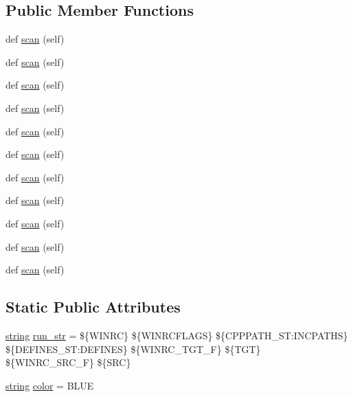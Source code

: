 \subsection*{Public Member Functions}
\begin{DoxyCompactItemize}
\item 
def \hyperlink{classwaflib_1_1_tools_1_1winres_1_1winrc_a7a306976a792ece0336a2e4a2cccf0e8}{scan} (self)
\item 
def \hyperlink{classwaflib_1_1_tools_1_1winres_1_1winrc_a7a306976a792ece0336a2e4a2cccf0e8}{scan} (self)
\item 
def \hyperlink{classwaflib_1_1_tools_1_1winres_1_1winrc_a7a306976a792ece0336a2e4a2cccf0e8}{scan} (self)
\item 
def \hyperlink{classwaflib_1_1_tools_1_1winres_1_1winrc_a7a306976a792ece0336a2e4a2cccf0e8}{scan} (self)
\item 
def \hyperlink{classwaflib_1_1_tools_1_1winres_1_1winrc_a7a306976a792ece0336a2e4a2cccf0e8}{scan} (self)
\item 
def \hyperlink{classwaflib_1_1_tools_1_1winres_1_1winrc_a7a306976a792ece0336a2e4a2cccf0e8}{scan} (self)
\item 
def \hyperlink{classwaflib_1_1_tools_1_1winres_1_1winrc_a7a306976a792ece0336a2e4a2cccf0e8}{scan} (self)
\item 
def \hyperlink{classwaflib_1_1_tools_1_1winres_1_1winrc_a7a306976a792ece0336a2e4a2cccf0e8}{scan} (self)
\item 
def \hyperlink{classwaflib_1_1_tools_1_1winres_1_1winrc_a7a306976a792ece0336a2e4a2cccf0e8}{scan} (self)
\item 
def \hyperlink{classwaflib_1_1_tools_1_1winres_1_1winrc_a7a306976a792ece0336a2e4a2cccf0e8}{scan} (self)
\item 
def \hyperlink{classwaflib_1_1_tools_1_1winres_1_1winrc_a7a306976a792ece0336a2e4a2cccf0e8}{scan} (self)
\end{DoxyCompactItemize}
\subsection*{Static Public Attributes}
\begin{DoxyCompactItemize}
\item 
\hyperlink{test__lib_f_l_a_c_2format_8c_ab02026ad0de9fb6c1b4233deb0a00c75}{string} \hyperlink{classwaflib_1_1_tools_1_1winres_1_1winrc_ac045ab43f4739dbf7baa0530c84e6572}{run\+\_\+str} = \textquotesingle{}\$\{W\+I\+N\+RC\} \$\{W\+I\+N\+R\+C\+F\+L\+A\+GS\} \$\{C\+P\+P\+P\+A\+T\+H\+\_\+\+S\+T\+:\+I\+N\+C\+P\+A\+T\+HS\} \$\{D\+E\+F\+I\+N\+E\+S\+\_\+\+S\+T\+:\+D\+E\+F\+I\+N\+ES\} \$\{W\+I\+N\+R\+C\+\_\+\+T\+G\+T\+\_\+F\} \$\{T\+GT\} \$\{W\+I\+N\+R\+C\+\_\+\+S\+R\+C\+\_\+F\} \$\{S\+RC\}\textquotesingle{}
\item 
\hyperlink{test__lib_f_l_a_c_2format_8c_ab02026ad0de9fb6c1b4233deb0a00c75}{string} \hyperlink{classwaflib_1_1_tools_1_1winres_1_1winrc_aa2be34c268533a158e36bbb58854d232}{color} = \textquotesingle{}B\+L\+UE\textquotesingle{}
\end{DoxyCompactItemize}
